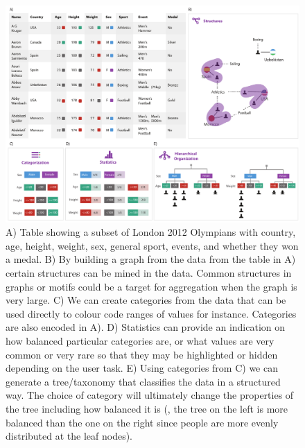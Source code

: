 \begin{figure}[h!]
\centering
\includegraphics[width=\textwidth]{images/ch3/computation_benefits}
\caption{A) Table showing a subset of London 2012 Olympians with country, age, height, weight, sex, general sport, events, and whether they won a medal.
B) By building a graph from the data from the table in A) certain structures can be mined in the data. Common structures in graphs or motifs could be a target for aggregation when the graph is very large.
C) We can create categories from the data that can be used directly to colour code ranges of values for instance. Categories are also encoded in A).
D) Statistics can provide an indication on how balanced particular categories are, or what values are very common or very rare so that they may be highlighted or hidden depending on the user task.
E) Using categories from C) we can generate a tree/taxonomy that classifies the data in a structured way.
The choice of category will ultimately change the properties of the tree including how balanced it is (\eg, the tree on the left is more balanced than the one on the right since people are more evenly distributed at the leaf nodes).}
\label{fig:computational_benefits}
\end{figure}

